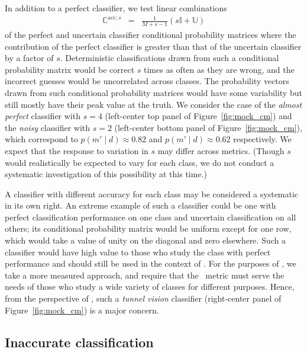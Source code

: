 In addition to a perfect classifier, we test linear combinations
\begin{eqnarray}
  \label{eq:lincomb}
  \mathbb{C}^{\mathrm{acc}; s} &=& \frac{1}{M+s-1} \left(s\mathbb{I} + \mathbb{U}\right)
\end{eqnarray}
of the perfect and uncertain classifier conditional probability matrices where the contribution of the perfect classifier is greater than that of the uncertain classifier by a factor of $s$.
Deterministic classifications drawn from such a conditional probability matrix would be correct $s$ times as often as they are wrong, and the incorrect guesses would be uncorrelated across classes.
The probability vectors drawn from such conditional probability matrices would have some variability but still mostly have their peak value at the truth.
We consider the case of the \textit{almost perfect} classifier with $s=4$ (left-center top panel of Figure~\ref{fig:mock_cm}) and the \textit{noisy} classifier with $s=2$ (left-center bottom panel of Figure~\ref{fig:mock_cm}), which correspond to $p(m' \mid d)\approx0.82$ and $p(m' \mid d)\approx0.62$ respectively.
We expect that the response to variation in $s$ may differ across metrics.
(Though $s$ would realistically be expected to vary for each class, we do not conduct a systematic investigation of this possibility at this time.)

A classifier with different accuracy for each class may be considered a systematic in its own right.
An extreme example of such a classifier could be one with perfect classification performance on one class and uncertain classification on all others; its conditional probability matrix would be uniform except for one row, which would take a value of unity on the diagonal and zero elsewhere.
Such a classifier would have high value to those who study the class with perfect performance and should still be used in the context of \lsst.
For the purposes of \plasticc, we take a more measured approach, and require that the \plasticc\ metric must serve the needs of those who study a wide variety of classes for different purposes. Hence, from the perspective of \plasticc, such a \textit{tunnel vision} classifier (right-center panel of Figure~\ref{fig:mock_cm}) is a major concern.
\subsection{Inaccurate classification}
\label{sec:inaccuratedata}

